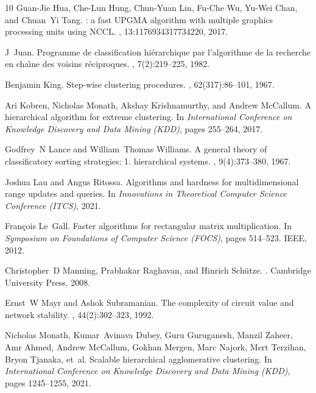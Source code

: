\documentclass[11pt]{article}
\begin{document}
\begin{thebibliography}{10}
Guan-Jie Hua, Che-Lun Hung, Chun-Yuan Lin, Fu-Che Wu, Yu-Wei Chan, and Chuan~Yi Tang.
: a fast {UPGMA} algorithm with multiple graphics processing units using {NCCL}.
, 13:1176934317734220, 2017.

J~Juan.
\newblock Programme de classification hi{\'e}rarchique par l'algorithme de la recherche en cha{\^\i}ne des voisins r{\'e}ciproques.
, 7(2):219--225, 1982.

Benjamin King.
\newblock Step-wise clustering procedures.
, 62(317):86--101, 1967.

Ari Kobren, Nicholas Monath, Akshay Krishnamurthy, and Andrew McCallum.
\newblock A hierarchical algorithm for extreme clustering.
\newblock In {\em International Conference on Knowledge Discovery and Data Mining (KDD)}, pages 255--264, 2017.

Godfrey~N Lance and William~Thomas Williams.
\newblock A general theory of classificatory sorting strategies: 1. hierarchical systems.
, 9(4):373--380, 1967.

Joshua Lau and Angus Ritossa.
\newblock Algorithms and hardness for multidimensional range updates and queries.
\newblock In {\em Innovations in Theoretical Computer Science Conference (ITCS)}, 2021.

Fran{\c{c}}ois Le~Gall.
\newblock Faster algorithms for rectangular matrix multiplication.
\newblock In {\em Symposium on Foundations of Computer Science (FOCS)}, pages 514--523. IEEE, 2012.

Christopher~D Manning, Prabhakar Raghavan, and Hinrich Sch{\"u}tze.
.
\newblock Cambridge University Press, 2008.

Ernst~W Mayr and Ashok Subramanian.
\newblock The complexity of circuit value and network stability.
, 44(2):302--323, 1992.

Nicholas Monath, Kumar~Avinava Dubey, Guru Guruganesh, Manzil Zaheer, Amr Ahmed, Andrew McCallum, Gokhan Mergen, Marc Najork, Mert Terzihan, Bryon Tjanaka, et~al.
\newblock Scalable hierarchical agglomerative clustering.
\newblock In {\em International Conference on Knowledge Discovery and Data Mining (KDD)}, pages 1245--1255, 2021.


\end{thebibliography}
\end{document}
